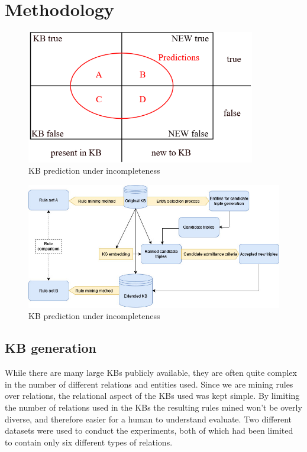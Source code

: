 \chapter{Methodology}

\begin{figure}[htp]
    \centering
    \includegraphics[width=10cm]{figures/kb_venn.png}
    \caption{KB prediction under incompleteness}
\end{figure}

\begin{figure}[htp]
    \centering
    \includegraphics[width=12cm]{figures/ontology_mining_pipeline.jpg}
    \caption{KB prediction under incompleteness}
\end{figure}


\section{KB generation}
While there are many large KBs publicly available, they are often quite complex in the number of different relations and entities used. Since we are mining rules over relations, the relational aspect of the KBs used was kept simple. By limiting the number of relations used in the KBs the resulting rules mined won't be overly diverse, and therefore easier for a human to understand evaluate. Two different datasets were used to conduct the experiments, both of which had been limited to contain only six different types of relations.


